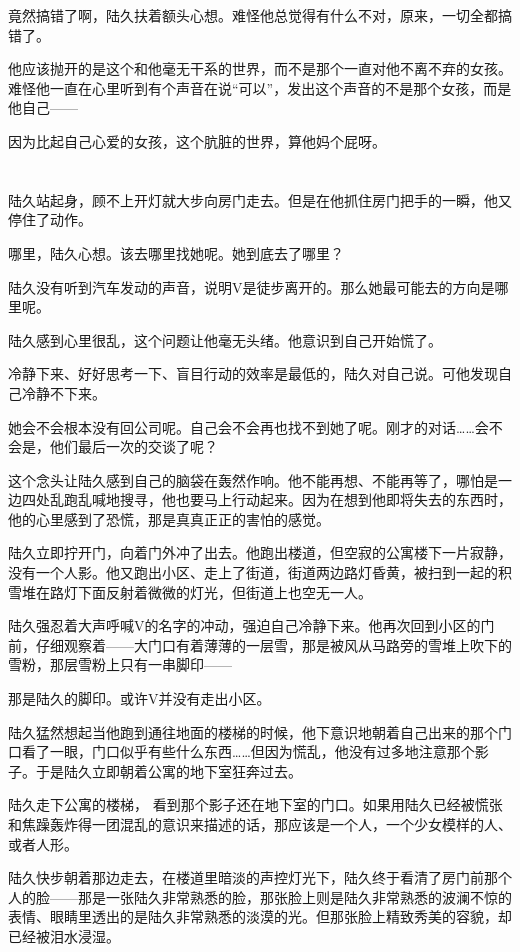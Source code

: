 竟然搞错了啊，陆久扶着额头心想。难怪他总觉得有什么不对，原来，一切全都搞错了。

他应该抛开的是这个和他毫无干系的世界，而不是那个一直对他不离不弃的女孩。难怪他一直在心里听到有个声音在说“可以”，发出这个声音的不是那个女孩，而是他自己——

因为比起自己心爱的女孩，这个肮脏的世界，算他妈个屁呀。

\section*{}

陆久站起身，顾不上开灯就大步向房门走去。但是在他抓住房门把手的一瞬，他又停住了动作。

哪里，陆久心想。该去哪里找她呢。她到底去了哪里？

陆久没有听到汽车发动的声音，说明V是徒步离开的。那么她最可能去的方向是哪里呢。

陆久感到心里很乱，这个问题让他毫无头绪。他意识到自己开始慌了。

冷静下来、好好思考一下、盲目行动的效率是最低的，陆久对自己说。可他发现自己冷静不下来。

她会不会根本没有回公司呢。自己会不会再也找不到她了呢。刚才的对话……会不会是，他们最后一次的交谈了呢？

这个念头让陆久感到自己的脑袋在轰然作响。他不能再想、不能再等了，哪怕是一边四处乱跑乱喊地搜寻，他也要马上行动起来。因为在想到他即将失去的东西时，他的心里感到了恐慌，那是真真正正的害怕的感觉。

陆久立即拧开门，向着门外冲了出去。他跑出楼道，但空寂的公寓楼下一片寂静，没有一个人影。他又跑出小区、走上了街道，街道两边路灯昏黄，被扫到一起的积雪堆在路灯下面反射着微微的灯光，但街道上也空无一人。

陆久强忍着大声呼喊V的名字的冲动，强迫自己冷静下来。他再次回到小区的门前，仔细观察着——大门口有着薄薄的一层雪，那是被风从马路旁的雪堆上吹下的雪粉，那层雪粉上只有一串脚印——

那是陆久的脚印。或许V并没有走出小区。

陆久猛然想起当他跑到通往地面的楼梯的时候，他下意识地朝着自己出来的那个门口看了一眼，门口似乎有些什么东西……但因为慌乱，他没有过多地注意那个影子。于是陆久立即朝着公寓的地下室狂奔过去。

陆久走下公寓的楼梯， 看到那个影子还在地下室的门口。如果用陆久已经被慌张和焦躁轰炸得一团混乱的意识来描述的话，那应该是一个人，一个少女模样的人、或者人形。

陆久快步朝着那边走去，在楼道里暗淡的声控灯光下，陆久终于看清了房门前那个人的脸——那是一张陆久非常熟悉的脸，那张脸上则是陆久非常熟悉的波澜不惊的表情、眼睛里透出的是陆久非常熟悉的淡漠的光。但那张脸上精致秀美的容貌，却已经被泪水浸湿。


